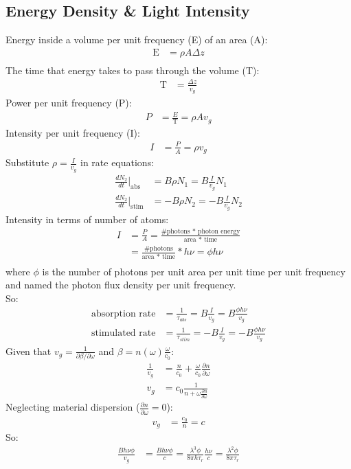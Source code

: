 \documentclass[11pt]{article}
\begin{document}
\subsection{Energy Density \& Light Intensity}
Energy inside a volume per unit frequency (E) of an area (A):
\begin{align*}
    \text{E} &= \rho A \Delta z \\
\end{align*}
The time that energy takes to pass through the volume (T):
\begin{align*}
    \text{T} &= \frac{\Delta z}{v_g}
\end{align*}
Power per unit frequency (P):
\begin{align*}
    P &= \frac{E}{\text{T}} = \rho A  v_g
\end{align*}
Intensity per unit frequency (I):
\begin{align*}
    I &= \frac{P}{A} = \rho v_g
\end{align*}
Substitute $\rho = \frac{I}{v_g}$ in rate equations:
\begin{align*}
    \frac{dN_2}{dt} \bigg|_{\text{abs}} &= B \rho N_1 = B \frac{I}{v_g} N_1 \\
    \frac{dN_2}{dt} \bigg|_{\text{stim}} &= -B \rho N_2 = -B \frac{I}{v_g} N_2
\end{align*}
Intensity in terms of number of atoms:
\begin{align*}
    I &= \frac{P}{A} = \frac{\text{\# photons * photon energy}}{\text{area * time}} \\
    &= \frac{\text{\# photons}}{\text{area * time}} * h \nu = \phi h \nu\\
\end{align*}
where $\phi$ is the number of photons per unit area per unit time per unit frequency and named the photon flux density per unit frequency. \\
So:
\begin{align*}
    \text{absorption rate} &= \frac{1}{\tau_{abs}} = B \frac{I}{v_g} = B \frac{\phi h \nu}{v_g} \\
    \text{stimulated rate} &= \frac{1}{\tau_{stim}} = -B \frac{I}{v_g} = -B \frac{\phi h \nu}{v_g}
\end{align*}
Given that $v_g = \frac{1}{\partial \beta / \partial \omega}$ and $\beta = n(\omega) \frac{\omega}{c_0}$:
\begin{align*}
    \frac{1}{v_g} &= \frac{n}{c_0} + \frac{\omega}{c_0} \frac{\partial n}{\partial \omega} \\
    v_g &= c_0 \frac{1}{n + \omega \frac{\partial n}{\partial \omega}}
\end{align*}
Neglecting material dispersion ($\frac{\partial n}{\partial \omega} = 0$):
\begin{align*}
    v_g &= \frac{c_0}{n} = c
\end{align*}
So:
\begin{align*}
    \frac{B h \nu \phi}{v_g} &= \frac{B h \nu \phi}{c} = \frac{\lambda^3 \phi}{8 \pi h \tau_r} \frac{h \nu}{c} = \frac{\lambda^2 \phi}{8 \pi \tau_r}
\end{align*}
\end{document}
